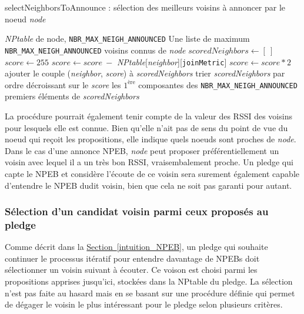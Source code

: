\documentclass[]{report}
\newcommand{\wordlink}[2]{\hyperref[#2]{#1~\ref{#2}}}
\begin{document}
\vspace{0.3cm}
\begin{algorithm}[!h]
\caption{selectNeighborsToAnnounce : sélection des meilleurs voisins à annoncer par le noeud \textit{node}}
\begin{algorithmic}[1]
\Require \textit{NPtable} de node, \texttt{NBR\_MAX\_NEIGH\_ANNOUNCED}
\Ensure Une liste de maximum \texttt{NBR\_MAX\_NEIGH\_ANNOUNCED} voisins connus de \textit{node}
\State $scoredNeighbors \leftarrow [\ ]$
\State $score \leftarrow 255$
\State $score \leftarrow score\ - $ \textit{NPtable}[\textit{neighbor}][\texttt{joinMetric}]
\State $score \leftarrow score * 2$
\EndIf
\State ajouter le couple (\textit{neighbor}, \textit{score}) à \textit{scoredNeighbors}
\EndFor
\State trier \textit{scoredNeighbors} par ordre décroissant sur le \textit{score}
\State\Return les $1^{\text{ère}}$ composantes des \texttt{NBR\_MAX\_NEIGH\_ANNOUNCED} premiers éléments de \textit{scoredNeighbors}
\end{algorithmic}
\label{proc_announce}
\end{algorithm}
\vspace{0.2cm}

La procédure pourrait également tenir compte de la valeur des RSSI des voisins pour lesquels elle est connue. Bien qu'elle n'ait pas de sens du point de vue du noeud qui reçoit les propositions, elle indique quels noeuds sont proches de \textit{node}. Dans le cas d'une annonce NPEB, \textit{node} peut proposer préférentiellement un voisin avec lequel il a un très bon RSSI, vraisembalement proche. Un pledge qui capte le NPEB et considère l'écoute de ce voisin sera surement également capable d'entendre le NPEB dudit voisin, bien que cela ne soit pas garanti pour autant.

\vspace{0.2cm}

\subsubsection{Sélection d'un candidat voisin parmi ceux proposés au pledge}

Comme décrit dans la \wordlink{Section}{intuition_NPEB}, un pledge qui souhaite continuer le processus itératif pour entendre davantage de NPEBs doit sélectionner un voisin suivant à écouter. Ce voison est choisi parmi les propositions apprises jusqu'ici, stockées dans la NPtable du pledge. La sélection n'est pas faite au hasard mais en se basant sur une procédure  définie qui permet de dégager le voisin le plus intéressant pour le pledge selon plusieurs critères.\\
\end{document}
